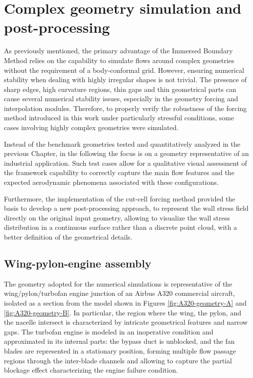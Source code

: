 \documentclass[12pt, a4paper, twoside, openright]{book}
\begin{document}
\chapter{Complex geometry simulation and post-processing}
\label{sec:complex-geometry-simulation}
As previously mentioned, the primary advantage of the Immersed Boundary Method relies on the capability to simulate flows around complex geometries without the requirement of a body-conformal grid. However, ensuring numerical stability when dealing with highly irregular shapes is not trivial. The presence of sharp edges, high curvature regions, thin gaps and thin geometrical parts can cause several numerical stability issues, especially in the geometry forcing and interpolation modules. Therefore, to properly verify the robustness of the forcing method introduced in this work under particularly stressful conditions, some cases involving highly complex geometries were simulated. 

Instead of the benchmark geometries tested and quantitatively analyzed in the previous Chapter, in the following the focus is on a geometry representative of an industrial application. Such test cases allow for a qualitative visual assessment of the framework capability to correctly capture the main flow features and the expected aerodynamic phenomena associated with these configurations.

Furthermore, the implementation of the cut-cell forcing method provided the basis to develop a new post-processing approach, to represent the wall stress field directly on the original input geometry, allowing to visualize the wall stress distribution in a continuous surface rather than a discrete point cloud, with a better definition of the geometrical details.

\section{Wing-pylon-engine assembly}
The geometry adopted for the numerical simulations is representative of the wing\-/pylon\-/turbofan engine junction of an Airbus A320 commercial aircraft, isolated as a section from the model shown in Figures \ref{fig:A320-geometry-A} and \ref{fig:A320-geometry-B}. In particular, the region where the wing, the pylon, and the nacelle intersect is characterized by intricate geometrical features and narrow gaps. The turbofan engine is modeled in an inoperative condition and approximated in its internal parts: the bypass duct is unblocked, and the fan blades are represented in a stationary position, forming multiple flow passage regions through the inter-blade channels and allowing to capture the partial blockage effect characterizing the engine failure condition.
\end{document}
